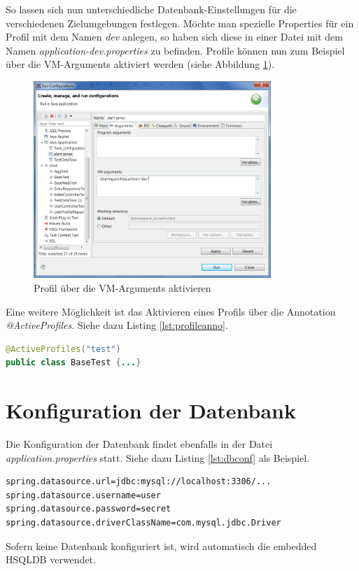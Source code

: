So lassen sich nun unterschiedliche Datenbank-Einstellungen für die verschiedenen Zielumgebungen festlegen. Möchte man spezielle Properties für ein Profil mit dem Namen \emph{dev} anlegen, so haben sich diese in einer Datei mit dem Namen \emph{application-dev.properties} zu befinden. Profile können nun zum Beispiel über die VM-Arguments aktiviert werden (siehe Abbildung \ref{fig:active-profile}).
\begin{figure}[H]
    \centering
    \includegraphics[width=0.8\textwidth]{Bilder/startlauncher.png}
    \caption{Profil über die VM-Arguments aktivieren}
    \label{fig:active-profile}
\end{figure}

Eine weitere Möglichkeit ist das Aktivieren eines Profils über die Annotation \emph{@ActiveProfiles}. Siehe dazu Listing \ref{lst:profileanno}.

   \begin{lstlisting}[caption={@ActiveProfiles Annotation},label={lst:profileanno},language=Java]
@ActiveProfiles("test")
public class BaseTest {...}
   \end{lstlisting}

\section{Konfiguration der Datenbank}\label{s_config_db}
Die Konfiguration der Datenbank findet ebenfalls in der Datei \emph{application.properties} statt. Siehe dazu Listing \ref{lst:dbconf} als Beispiel.
   \begin{lstlisting}[caption={Konfiguration der Datenbank},label={lst:dbconf}]
spring.datasource.url=jdbc:mysql://localhost:3306/...
spring.datasource.username=user
spring.datasource.password=secret
spring.datasource.driverClassName=com.mysql.jdbc.Driver
   \end{lstlisting}
   Sofern keine Datenbank konfiguriert ist, wird automatisch die embedded HSQLDB verwendet.


